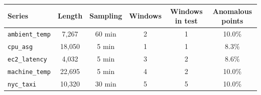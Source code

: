 \begin{tabular}{lccccc}
\toprule
Series & Length & Sampling & Windows & Windows in test & Anomalous points \\
\midrule
\texttt{ambient\_temp} & 7,267 & 60 min & 2 & 1 & 10.0\% \\
\texttt{cpu\_asg} & 18,050 & 5 min & 1 & 1 & 8.3\% \\
\texttt{ec2\_latency} & 4,032 & 5 min & 3 & 2 & 8.6\% \\
\texttt{machine\_temp} & 22,695 & 5 min & 4 & 2 & 10.0\% \\
\texttt{nyc\_taxi} & 10,320 & 30 min & 5 & 5 & 10.0\% \\
\bottomrule
\end{tabular}
